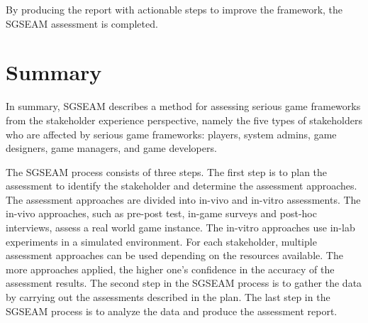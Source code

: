 By producing the report with actionable steps to improve the framework, the SGSEAM assessment is completed.  

\section{Summary}

In summary, SGSEAM describes a method for assessing serious game frameworks from the stakeholder experience perspective, namely the five types of stakeholders who are affected by serious game frameworks: players, system admins, game designers, game managers, and game developers.
 
The SGSEAM process consists of three steps. The first step is to plan the assessment to identify the stakeholder and determine the assessment approaches. 
The assessment approaches are divided into in-vivo and in-vitro assessments. The in-vivo approaches, such as pre-post test, in-game surveys and post-hoc interviews, assess a real world game instance. The in-vitro approaches use in-lab experiments in a simulated environment. For each stakeholder, multiple assessment approaches can be used depending on the resources available. The more approaches applied, the higher one's confidence in the accuracy of
the assessment results. The second step in the SGSEAM process is to gather the data by carrying out the assessments described in the plan. The last step in the SGSEAM process is to analyze the data and produce the assessment report.
